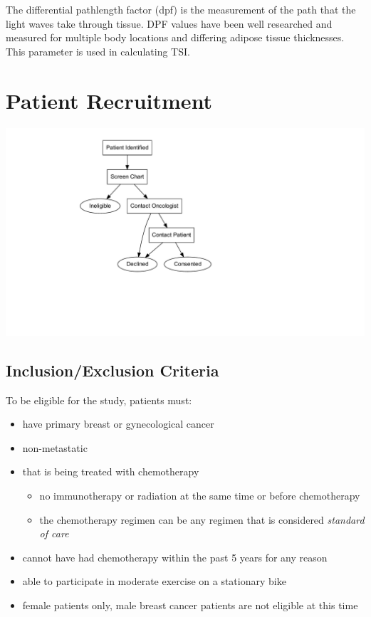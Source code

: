 \documentclass[
]{book}
\providecommand{\tightlist}{%
  \setlength{\itemsep}{0pt}\setlength{\parskip}{0pt}}
\begin{document}
The differential pathlength factor (dpf) is the measurement of the path that the light waves take through tissue. DPF values have been well researched and measured for multiple body locations and differing adipose tissue thicknesses. This parameter is used in calculating TSI.

\hypertarget{PatientRecruitment}{%
\chapter{Patient Recruitment}\label{PatientRecruitment}}

\includegraphics{nirs-study-info_files/figure-latex/unnamed-chunk-3-1.pdf}

\hypertarget{inclusionexclusion-criteria}{%
\section{Inclusion/Exclusion Criteria}\label{inclusionexclusion-criteria}}

To be eligible for the study, patients must:

\begin{itemize}
\tightlist
\item
  have primary breast or gynecological cancer
\item
  non-metastatic
\item
  that is being treated with chemotherapy

  \begin{itemize}
  \tightlist
  \item
    no immunotherapy or radiation at the same time or before chemotherapy
  \item
    the chemotherapy regimen can be any regimen that is considered \emph{standard of care}
  \end{itemize}
\item
  cannot have had chemotherapy within the past 5 years for any reason
\item
  able to participate in moderate exercise on a stationary bike
\item
  female patients only, male breast cancer patients are not eligible at this time
\end{itemize}
\end{document}
